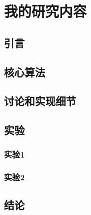 \ifx\atempxetex\usewhat 
\fi
{}

\chapter{我的研究内容}
\label{cha:research_contents}

\section{引言}
\label{sec5:introduction}



\section{核心算法}
\label{sec5:algorithm}



\section{讨论和实现细节}
\label{sec5:discussion_implementation_issues}



\section{实验}
\label{sec:experiments}



\subsection{实验1}
\label{subsec5:exp1}




\subsection{实验2}
\label{sec:exp2}



\section{结论}
\label{sec5:conclusion}



